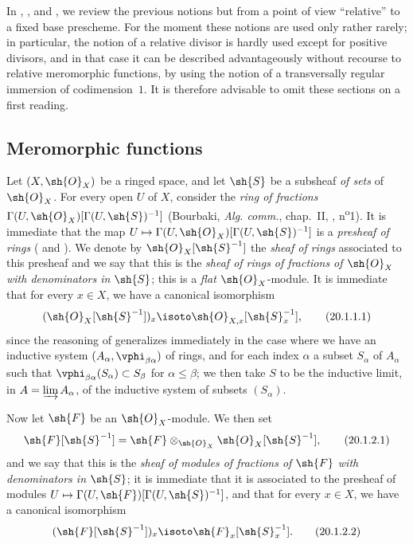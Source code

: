 In , , and , we review the previous notions but from a point of view ``relative'' to a fixed base prescheme.
For the moment these notions are used only rather rarely; in particular, the notion of a relative divisor is hardly used except for positive divisors, and in that case it can be described advantageously without recourse to relative meromorphic functions, by using the notion of a transversally regular immersion of codimension~$1$.
It is therefore advisable to omit these sections on a first reading.

\subsection{Meromorphic functions}
\label{IV.20.1}

\begin{env}[20.1.1]
\label{IV.20.1.1}
Let $(X,\sh{O}_X)$ be a ringed space, and let $\sh{S}$ be a subsheaf \emph{of sets} of $\sh{O}_X$.
For every open $U$ of $X$, consider the \emph{ring of fractions} $\Gamma(U,\sh{O}_X)[\Gamma(U,\sh{S})^{-1}]$ (Bourbaki, \emph{Alg. comm.}, chap.~II, , n\textsuperscript{o}1).
It is immediate that the map $U\mapsto\Gamma(U,\sh{O}_X)[\Gamma(U,\sh{S})^{-1}]$ is a \emph{presheaf of rings} ( and ).
We denote by $\sh{O}_X[\sh{S}^{-1}]$ the \emph{sheaf of rings} associated to this presheaf and we say that this is the \emph{sheaf of rings of fractions of $\sh{O}_X$ with denominators in $\sh{S}$};
this is a \emph{flat} $\sh{O}_X$-module.
It is immediate that for every $x\in X$, we have a canonical isomorphism
\[
\label{IV.20.1.1.1}
  (\sh{O}_X[\sh{S}^{-1}])_x\isoto\sh{O}_{X,x}[\sh{S}_x^{-1}],
  \tag{20.1.1.1}
\]
since the reasoning of  generalizes immediately in the case where we have an inductive system $(A_\alpha,\vphi_{\beta\alpha})$ of rings, and for each index $\alpha$ a subset $S_\alpha$ of $A_\alpha$ such that
$\vphi_{\beta\alpha}(S_\alpha)\subset S_\beta$ for $\alpha\leq\beta$;
we then take $S$ to be the inductive limit, in $A=\varinjlim A_\alpha$, of the inductive system of subsets $(S_\alpha)$.
\end{env}

\begin{env}[20.1.2]
\label{IV.20.1.2}
Now let $\sh{F}$ be an $\sh{O}_X$-module.
We then set
\[
\label{IV.20.1.2.1}
  \sh{F}[\sh{S}^{-1}]=\sh{F}\otimes_{\sh{O}_X}\sh{O}_X[\sh{S}^{-1}],
  \tag{20.1.2.1}
\]
and we say that this is the \emph{sheaf of modules of fractions of $\sh{F}$ with denominators in $\sh{S}$};
it is immediate that it is associated to the presheaf of modules $U\mapsto\Gamma(U,\sh{F})[\Gamma(U,\sh{S})^{-1}]$, and that for every $x\in X$, we have a canonical isomorphism
\[
\label{IV.20.1.2.2}
  (\sh{F}[\sh{S}^{-1}])_x\isoto\sh{F}_x[\sh{S}_x^{-1}].
  \tag{20.1.2.2}
\]
\end{env}


